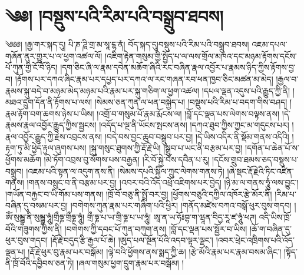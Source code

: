 \chapter{༄༅། །བསྡུས་པའི་རིམ་པའི་བསྒྲུབ་ཐབས།}༄༅༅། །རྒྱ་གར་སྐད་དུ། པི་ཎ་ཌཱི་གྲ་མ་སཱ་ངྷ་ནཾ། བོད་སྐད་དུ།བསྡུས་པའི་རིམ་པའི་བསྒྲུབ་ཐབས། འཇམ་དཔལ་གཞོན་ནུར་གྱུར་པ་ལ་ཕྱག་འཚལ་ལོ། །འཇིག་རྟེན་གསུམ་གྱི་སྤྱོད་པ་ལ་ལས་གྲོལ་མཁའ་དང་མཉམ་རྟོགས་དངོས་པོ་ཀུན་གྱི་ངོ་བོ་ཉིད། །དག་ཅིང་ཞི་ལ་རྣམ་དབེན་མཆོག་ཞིའི་རང་བཞིན་རྣལ་འབྱོར་པ་རྣམས་ཉིད་ཀྱིས་རྟོགས་བྱ་བ། །རྟོགས་པར་དཀའ་ཞིང་རྣམ་པར་དཔྱད་པར་དཀའ་ལ་རང་གཞན་རབ་ཕན་ཁྱབ་ཅིང་མཚན་མ་མེད། །རྒྱལ་བ་རྣམས་སྐུ་བདེ་བ་མཉམ་མེད་མཉམ་པའི་རྣམ་པར་སྐུ་གཅིག་ལ་ཕྱག་འཚལ། །དཔལ་ལྡན་འདུས་པའི་རྒྱུད་ཀྱི་ནི། །མཐའ་དྲུག་དོན་ནི་རྟོགས་པ་ལས། །སེམས་ཅན་ཀུན་ལ་ཕན་བསྐྱེད་པ། །བསྡུས་པའི་རིམ་པ་བདག་གིས་བཤད། །རྣམ་རྟོག་བག་ཆགས་ཉེས་པ་ཡིས། །འགྲོ་བ་གསུམ་པོ་རྣམ་རྨོངས་ལ། །བློ་དང་ལྡན་པས་ལེགས་བལྟས་ནས། །དེ་རྣམས་རྣལ་འབྱོར་རྒྱུད་ཀྱིས་སྦྱངས། །འདོད་པ་ལྔ་ནི་ཡོངས་སྤངས་ནས། །དཀའ་ཐུབ་ཀྱིས་ཀྱང་མ་གདུངས་པར། །རྣལ་འབྱོར་རྒྱུད་ཀྱི་རྗེས་འབྲངས་ནས། །བདེ་བས་བྱང་ཆུབ་བསྒྲུབ་པར་བྱ། །དེ་ཡིས་འདིར་ནི་སྡོམ་གནས་འདིའི། །རྟག་ཏུ་མི་ཕྱེད་རྟུལ་ཞུགས་པས། །སྐུ་གསུང་ཐུགས་ཀྱི་རྡོ་རྗེ་ཡི། །སྒྲུབ་པ་ཡང་ནི་བརྩམ་པར་བྱ། །དགོན་པ་ཆེན་པོ་ས་ཕྱོགས་མཆོག །མེ་ཏོག་འབྲས་བུ་སོགས་པས་བརྒྱན། །རི་བོ་སྐྱེ་བོས་དབཻན་པ་རུ། །དངོས་གྲུབ་ཐམས་ཅད་བསྡུས་པ་བསྒྲུབ། །འཇམ་པའི་སྟན་ལ་འདུག་ནས་ནི། །སེམས་དཔའི་སྐྱིལ་ཀྲུང་ལེགས་གནས་ཏེ། །ཞེ་སྡང་རྡོ་རྗེའི་ཏིང་འཛིན་གནས། །གནས་བསྲུང་བ་ནི་བརྩམ་པར་བྱ། །འབར་བའི་འོད་འཕྲོ་འཇིགས་པར་བྱེད། །ཉི་མ་ལ་གནས་ཧཱུཾ་ལས་བྱུང་། །གཡོན་བརྐྱང་བ་ཡི་གོམ་པས་གནས། །ཁྲོ་བོ་བཅུ་ནི་སྤྲོ་བར་བྱ། །ཕྱོགས་བཅུའི་དཀྱིལ་འཁོར་རྩེ་མོར་ནི། །རིམ་པ་བཞིན་དུ་བསམ་པར་བྱ། །བགེགས་ཀུན་རྣམ་པར་གཞིག་པའི་ཕྱིར། །གནོད་མཛེས་བཀའ་བསྒོ་ཕུར་བུས་གདབ། །ཨོཾ་སུམྦྷ་ནི་སུམྦྷ་ཧཱུཾ།གྲྀཧྞ་གྲྀཧྞ་ཧཱུཾ། གྲྀ་ཧྞ་པ་ཡ་གྲི་ཧྞ་པ་ཡ་ཧཱུཾ། ཨཱ་ན་ཡ་ཧོཿབྷ་ག་ཝཱན་བིདྱ་རཱ་ཛ་ཧཱུཾ་ཕཊ། འདི་ཡིས་ཁྲོ་བོའི་གཟུགས་ཀྱིས་ནི། །བགེགས་ཀྱི་དབང་པོ་ཀུན་བཀུག་ནས། །བློ་དང་ལྡན་པས་སྦྱོར་བ་ཡིས། །ཆོ་ག་བཞིན་དུ་ཕུར་བུས་གདབ། །རྡོ་རྗེ་བདུད་རྩི་རྒྱལ་པོ་ཆེ། །ཨུད་པལ་སྔོན་པོའི་འདབ་ལྟར་ལྗང་། །འབར་ཕྲེང་འཁྲིགས་པའི་འོད་ལྡན་པ། །རྡོ་རྗེ་ཕུར་བུ་རྣམ་པར་བསྒོམ། །ལྟེ་བའི་ཕྱོགས་ནས་སྨད་ཀྱི་ཆ། །རྩེ་མོའི་རྣམ་པར་རྣམ་བསམ་ཞིང་། །སྟོད་ནི་ཁྲོ་བོའི་དབྱིབས་ཅན་ཏེ། །ཞལ་གསུམ་ཕྱག་དྲུག་རྣམ་པར་བསྒོམ། །
